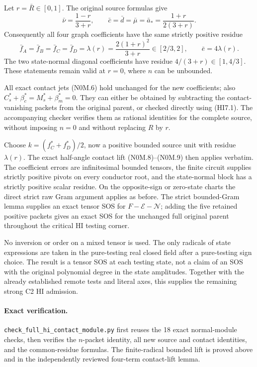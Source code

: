 Let $r=\bar R\in[0,1]$. The original source formulas give
\[
 \bar\nu=\frac{1-r}{3+r},\qquad
 \bar c=\bar d=\bar\mu=\bar a_*
        =\frac{1+r}{2(3+r)}.
\]
Consequently all four graph coefficients have the same strictly positive
residue
\[
 \bar f_A=\bar f_B=\bar f_C=\bar f_D
       =\lambda(r)=\frac{2(1+r)^2}{3+r}\in[2/3,2],
 \qquad \bar e=4\lambda(r).                       \tag{HI7.4}
\]
The two state-normal diagonal coefficients have residue
$4/(3+r)\in[1,4/3]$.
These statements remain valid at $r=0$, where $n$ can be unbounded.

All exact contact jets (N0M.6) hold unchanged for the new coefficients;
also $C_s^*+\beta_c^*=M_s^*+\beta_m^*=0$. They can either be obtained
by subtracting the contact-vanishing packets from the original parent,
or checked directly using (HI7.1). The accompanying checker verifies
them as rational identities for the complete source, without imposing
$n=0$ and without replacing $R$ by $r$.

Choose $k=(f_C^*+f_D^*)/2$, now a positive bounded source unit with
residue $\lambda(r)$. The exact half-angle contact lift (N0M.8)--(N0M.9)
then applies verbatim. The coefficient errors are infinitesimal bounded
tensors, the finite circuit supplies strictly positive pivots on every
conductor root, and the state-normal block has a strictly positive
scalar residue. On
the opposite-sign or zero-state charts the direct strict raw Gram
argument applies as before. The strict bounded-Gram lemma supplies an
exact tensor SOS for $F-\mathcal E-\mathcal N$; adding the five retained
positive packets gives an exact SOS for the unchanged full original
parent throughout the critical HI testing corner.

No inversion or order on a mixed tensor is used. The only radicals of
state expressions are taken in the pure-testing real closed field after
a pure-testing sign choice. The result is a tensor SOS at each testing
state, not a claim of an SOS with the original polynomial degree in the
state amplitudes. Together with the already established remote tests
and literal axes, this supplies the remaining strong C2 HI admission.

\paragraph{Exact verification.}
\texttt{check\_full\_hi\_contact\_module.py} first reuses the 18 exact
normal-module checks, then verifies the $n$-packet identity, all new
source and contact identities, and the common-residue formulas. The
finite-radical bounded lift is proved above and in the independently
reviewed four-term contact-lift lemma.

